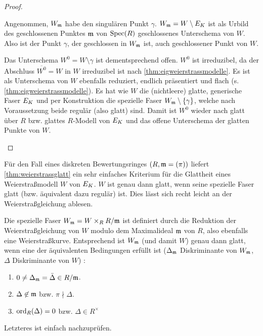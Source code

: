 \documentclass[german]{scrreprt}
\begin{document}
\begin{Lemma}
\begin{proof}
\begin{enumerate}[label=(\alph*)]
      Angenommen, $W_{\mathfrak{m}}$ habe den singulären Punkt $\gamma$.
      $W_{\mathfrak{m}}=W\setminus E_{K}$ ist als Urbild des geschlossenen Punktes
      $\mathfrak{m}$ von $\operatorname{Spec}(R)$ geschlossenes Unterschema von $W$.
      Also ist der Punkt $\gamma$, der geschlossen in $W_{\mathfrak{m}}$ ist, auch
      geschlossener Punkt von $W$.
      
      Das Unterschema $W^0=W\setminus\gamma$ ist dementsprechend offen.
      $W^0$ ist irreduzibel, da der Abschluss $\overline{W^0}=W$ in
      $W$ irreduzibel ist nach \autoref{thm:eigweierstrassmodelle}.
      Es ist als Unterschema von $W$ ebenfalls reduziert, endlich
      präsentiert und flach (s. \autoref{thm:eigweierstrassmodelle}).
      Es hat wie $W$ die (nichtleere) glatte, generische Faser $E_{K}$ und
      per Konstruktion die spezielle Faser $W_{\mathfrak{m}}\setminus\{\gamma\}$,
      welche nach Voraussetzung beide regulär (also glatt) sind.
      Damit ist $W^0$ wieder nach \cite[8.5, Proposition 17]{bosch}
      glatt über $R$ bzw. glattes $R$-Modell von $E_{K}$ und das offene
      Unterschema der glatten Punkte von $W$.
    \end{enumerate}
  \end{proof}
\end{Lemma}

\begin{Bemerkung}\label{thm:weierstraßmodellglatt}
  Für den Fall eines diskreten Bewertungsringes $(R,\mathfrak{m}=(\pi))$ liefert
  \autoref{thm:weierstrassglatt} ein sehr einfaches Kriterium für die
  Glattheit eines Weierstraßmodell $W$ von $E_{K}$.
  $W$ ist genau dann glatt, wenn seine spezielle Faser glatt
  (bzw. äquivalent dazu regulär) ist.
  Dies lässt sich recht leicht an der Weierstraßgleichung ablesen.
  
  Die spezielle Faser $W_{\mathfrak{m}}=W\times_R R/\mathfrak{m}$ ist definiert
  durch die Reduktion der Weierstraßgleichung von $W$ modulo dem
  Maximalideal $\mathfrak{m}$ von $R$, also ebenfalls eine Weierstraßkurve.
  Entsprechend ist $W_{\mathfrak{m}}$ (und damit $W$) genau dann glatt, wenn
  eine der äquivalenten Bedingungen erfüllt ist
  ($\Delta_{\mathfrak{m}}$ Diskriminante von $W_{\mathfrak{m}}$,
  $\Delta$ Diskriminante von $W$)
  \cite[Proposition VII.5.1 (a)]{silverman}:
  \begin{enumerate}[label=(\roman*)]
  \item $0\neq\Delta_{\mathfrak{m}}=\bar\Delta\in R/\mathfrak{m}$.
  \item $\Delta\not\in\mathfrak{m}$ bzw. $\pi\nmid\Delta$.
  \item $\operatorname{ord}_R(\Delta)=0$ bzw. $\Delta\in R^\times$
  \end{enumerate}
  Letzteres ist einfach nachzuprüfen.
\end{Bemerkung}
\end{document}
